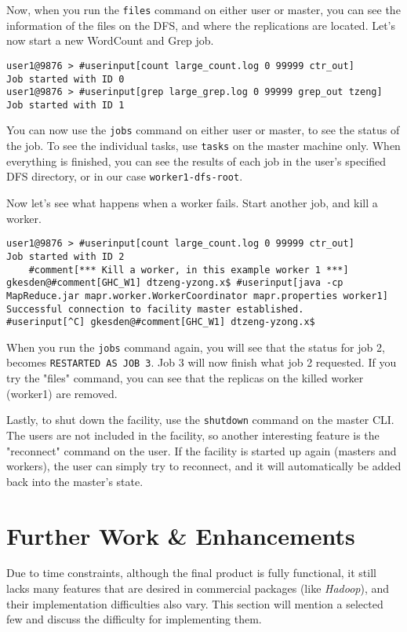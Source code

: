 \documentclass{article} %
\begin{document}
\par\qquad Now, when you run the \texttt{files} command on either user or master, you can see the information of the files on the DFS, and where the replications are located.  Let's now start a new WordCount and Grep job.
\begin{Verbatim}[commandchars=\#\[\]]
user1@9876 > #userinput[count large_count.log 0 99999 ctr_out]
Job started with ID 0
user1@9876 > #userinput[grep large_grep.log 0 99999 grep_out tzeng]
Job started with ID 1
\end{Verbatim}
You can now use the \texttt{jobs} command on either user or master, to see the status of the job.  To see the individual tasks, use \texttt{tasks} on the master machine only.  When everything is finished, you can see the results of each job in the user's specified DFS directory, or in our case \texttt{worker1-dfs-root}.

\par Now let's see what happens when a worker fails.  Start another job, and kill a worker.
\begin{Verbatim}[fontsize=\scriptsize, xleftmargin=-.2in,commandchars=\#\[\]]
user1@9876 > #userinput[count large_count.log 0 99999 ctr_out]
Job started with ID 2
	#comment[*** Kill a worker, in this example worker 1 ***]
gkesden@#comment[GHC_W1] dtzeng-yzong.x$ #userinput[java -cp MapReduce.jar mapr.worker.WorkerCoordinator mapr.properties worker1]
Successful connection to facility master established.
#userinput[^C] gkesden@#comment[GHC_W1] dtzeng-yzong.x$
\end{Verbatim}
When you run the \texttt{jobs} command again, you will see that the status for job 2, becomes \texttt{RESTARTED AS JOB 3}.  Job 3 will now finish what job 2 requested.  If you try the "files" command, you can see that the replicas on the killed worker (worker1) are removed.
\par\qquad Lastly, to shut down the facility, use the \texttt{shutdown} command on the master CLI.  The users are not included in the facility, so another interesting feature is the "reconnect" command on the user.  If the facility is started up again (masters and workers), the user can simply try to reconnect, and it will automatically be added back into the master's state.

\section{Further Work \& Enhancements}

\par\qquad Due to time constraints, although the final product is fully functional, it still lacks many features that are desired in commercial packages (like \emph{Hadoop}), and their implementation difficulties also vary. This section will mention a selected few and discuss the difficulty for implementing them.
\end{document}

